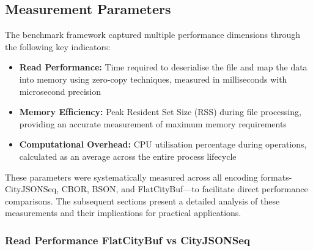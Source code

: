 

\subsection{Measurement Parameters}
\label{result:benchmark_on_local_environment:measurement_parameters}

The benchmark framework captured multiple performance dimensions through the following key indicators:

\begin{itemize}
  \item \textbf{Read Performance:} Time required to deserialise the file and map the data into memory using zero-copy techniques, measured in milliseconds with microsecond precision

  \item \textbf{Memory Efficiency:} Peak Resident Set Size (RSS) during file processing, providing an accurate measurement of maximum memory requirements

  \item \textbf{Computational Overhead:} CPU utilisation percentage during operations, calculated as an average across the entire process lifecycle

\end{itemize}

These parameters were systematically measured across all encoding formats-CityJSONSeq, CBOR, BSON, and FlatCityBuf—to facilitate direct performance comparisons.  The subsequent sections present a detailed analysis of these measurements and their implications for practical applications.

\subsubsection{Read Performance FlatCityBuf vs CityJSONSeq}
\label{result:benchmark_on_local_environment:read_performance_flatcitybuf_vs_cityjsonseq}

